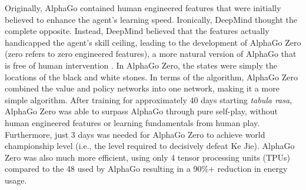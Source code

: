 Originally, AlphaGo contained human engineered features that were initially believed to enhance the agent's learning speed. Ironically, DeepMind thought the complete opposite.  Instead, DeepMind believed that the features actually handicapped the agent's skill ceiling, leading to the development of AlphaGo Zero (zero refers to zero engineered features), a more natural version of AlphaGo that is free of human intervention \cite{alphagozero}. In AlphaGo Zero, the states were simply the locations of the black and white stones. In terms of the algorithm, AlphaGo Zero combined the value and policy networks into one network, making it a more simple algorithm. After training for approximately 40 days starting \textit{tabula rasa}, AlphaGo Zero was able to surpass AlphaGo through pure self-play, without human engineered features or learning fundamentals from human play. Furthermore, just 3 days was needed for AlphaGo Zero to achieve world championship level (i.e., the level required to decisively defeat Ke Jie). AlphaGo Zero was also much more efficient, using only 4 tensor processing units (TPUs) compared to the 48 used by AlphaGo resulting in a 90\%+ reduction in energy usage.

